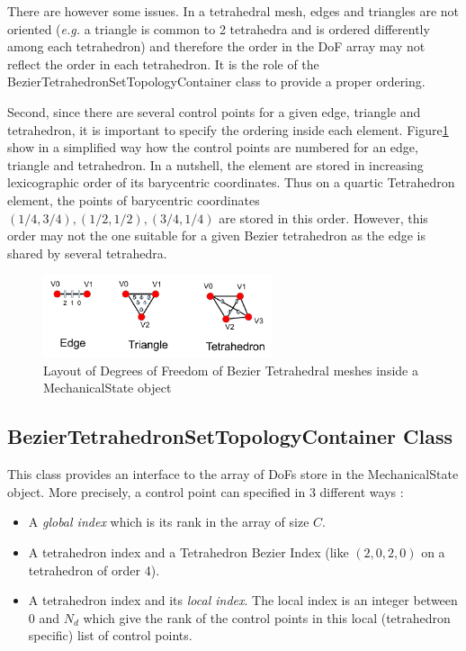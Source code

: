 \documentclass[a4paper,11pt]{article}
\newcommand{\ncontrols}{{C}}
\newcommand{\degree}{{d}}
\begin{document}
There are however some issues. In a tetrahedral mesh, edges and triangles are not oriented ({\em e.g.} a triangle is common to 2 tetrahedra and is ordered differently among each tetrahedron) and therefore the order in the DoF array may not reflect the order in each tetrahedron. It is the role of the BezierTetrahedronSetTopologyContainer class to provide a proper ordering.

Second, since there are several control points for a given edge, triangle and tetrahedron, it is important to specify the ordering inside each element. Figure\ref{fig:DofBezierTetrahedronTesselation} show in a simplified way how the control points are numbered for an edge, triangle and tetrahedron. In a nutshell, the element are stored in increasing lexicographic order of its barycentric coordinates. Thus on a quartic Tetrahedron element, the points of barycentric coordinates $(1/4, 3/4), (1/2,1/2), (3/4, 1/4)$ are stored in this order. However, this order may not the one suitable for a given Bezier tetrahedron as the edge is shared by several tetrahedra.

\begin{figure}[!htbp]
	\centering
    \includegraphics[width=0.60\textwidth]{DofBezierTetrahedronTesselation}
	\caption{Layout of Degrees of Freedom of Bezier Tetrahedral meshes inside a MechanicalState object}
	\label{fig:DofBezierTetrahedronTesselation}
\end{figure}

\subsection{BezierTetrahedronSetTopologyContainer Class}

This class provides an interface to the array of DoFs store in the MechanicalState object. More precisely, a control point can specified in 3 different ways :

\begin{itemize}
	\item A {\em global index} which is its rank in the array of size $\ncontrols$.
	\item A tetrahedron index and a Tetrahedron Bezier Index (like $(2,0,2,0)$ on a tetrahedron of order 4).
	\item A tetrahedron index and its {\em local index}. The local index is an integer between 0 and $N_\degree$ which give the rank of the control points in this local (tetrahedron specific) list of control points.
\end{itemize}
\end{document}
